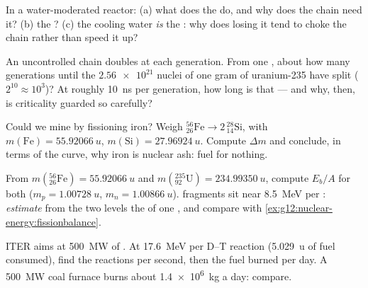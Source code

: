 \begin{exercise}[$\star\star$]\label{exo:g12:nuclear-energy:11}
In a water-moderated reactor: (a) what does the  do, and why does
the chain need it? (b) the ? (c) the cooling water \emph{is} the
: why does losing it tend to choke the chain rather than speed it up?
\end{exercise}

\begin{exercise}[$\star\star\star$]\label{exo:g12:nuclear-energy:12}
An uncontrolled chain doubles at each generation. From one , about how
many generations until the $\num{2.56e21}$ nuclei of one gram of uranium-235
have split ($2^{10} \approx 10^{3}$)? At roughly \qty{10}{ns} per generation,
how long is that --- and why, then, is criticality guarded so carefully?
\end{exercise}

\begin{exercise}[$\star\star\star$]\label{exo:g12:nuclear-energy:13}
Could we mine  by fissioning iron? Weigh
${}^{56}_{26}\mathrm{Fe} \to 2\,{}^{28}_{14}\mathrm{Si}$, with
$m(\mathrm{Fe}) = \qty{55.92066}{u}$, $m(\mathrm{Si}) = \qty{27.96924}{u}$.
Compute $\Delta m$ and conclude, in terms of the curve, why iron is nuclear
ash: fuel for nothing.
\end{exercise}

\begin{exercise}[$\star\star\star$]\label{exo:g12:nuclear-energy:14}
From $m({}^{56}_{26}\mathrm{Fe}) = \qty{55.92066}{u}$ and
$m({}^{235}_{92}\mathrm{U}) = \qty{234.99350}{u}$, compute $E_b/A$ for both
($m_p = \qty{1.00728}{u}$, $m_n = \qty{1.00866}{u}$).  fragments sit
near \qty{8.5}{MeV} per : \emph{estimate} from the two levels the 
of one , and compare with \cref{ex:g12:nuclear-energy:fissionbalance}.
\end{exercise}

\begin{exercise}[$\star\star\star$]\label{exo:g12:nuclear-energy:15}
ITER aims at \qty{500}{MW} of  . At \qty{17.6}{MeV} per D--T
reaction (\qty{5.029}{u} of fuel consumed), find the reactions per second,
then the fuel burned per day. A \qty{500}{MW} coal furnace burns about
\qty{1.4e6}{kg} a day: compare.
\end{exercise}

